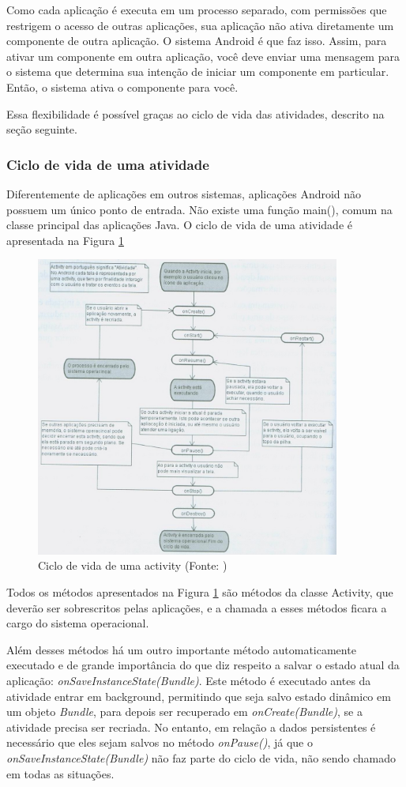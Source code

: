 Como cada aplicação é executa em um processo separado, com permissões que restrigem 
o acesso de outras aplicações, sua aplicação não ativa diretamente um componente de 
outra aplicação. O sistema Android é que faz isso. Assim, para ativar um componente 
em outra aplicação, você deve enviar uma mensagem para o sistema que determina sua 
intenção de iniciar um componente em particular. Então, o sistema ativa o componente 
para você.

Essa flexibilidade é possível graças ao ciclo de vida das atividades, descrito na 
seção seguinte.

\subsubsection{Ciclo de vida de uma atividade}

Diferentemente de aplicações em outros sistemas, aplicações Android não possuem 
um único ponto de entrada. Não existe uma função main(), comum na classe principal 
das aplicações Java. O ciclo de vida de uma atividade é apresentada na Figura
\ref{Activity_lifecycle}

\begin{figure}[h]
    \centering
    \includegraphics[width=10cm]{img/android_lecheta}
    \caption[Ciclo de vida de uma activity]{Ciclo de vida de uma activity (Fonte: \cite{lecheta})}
    \label{Activity_lifecycle}
\end{figure}

Todos os métodos apresentados na Figura \ref{Activity_lifecycle} são métodos 
da classe Activity, que deverão ser sobrescritos pelas aplicações, e a chamada a
esses métodos ficara a cargo do sistema operacional.

Além desses métodos há um outro importante método automaticamente executado e de 
grande importância do que diz respeito a salvar o estado atual da aplicação: 
{\it onSaveInstanceState(Bundle)}. Este método é executado antes da atividade entrar em 
background, permitindo que seja salvo estado dinâmico em um objeto {\it Bundle}, para depois 
ser recuperado em {\it onCreate(Bundle)}, se a atividade precisa ser recriada. No entanto,
em relação a dados persistentes é necessário que eles sejam salvos no método {\it onPause()}, 
já que o {\it onSaveInstanceState(Bundle)} não faz parte do ciclo de vida, não sendo chamado 
em todas as situações.


